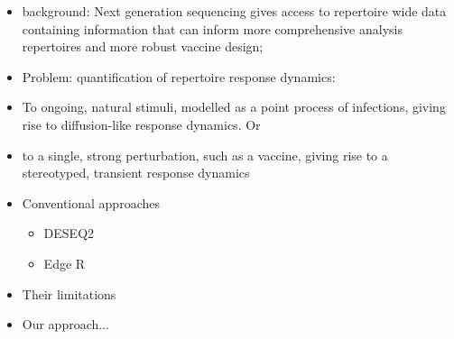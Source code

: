 \documentclass[letterpaper,english,prl,reprint,longbibliography]{revtex4-1} %
\begin{document}
\maketitle
\begin{itemize}
\item background: Next generation sequencing gives access to repertoire wide data containing information that can inform more comprehensive analysis repertoires and more robust vaccine design;
\item Problem: quantification of repertoire response dynamics:
\item To ongoing, natural stimuli, modelled as a point process of infections, giving rise to diffusion-like response dynamics. Or
\item to a single, strong perturbation, such as a vaccine, giving rise to a stereotyped, transient response dynamics
\item Conventional approaches
\begin{itemize}
	\item DESEQ2
	\item Edge R
\end{itemize}
\item  Their limitations
\item  Our approach...
\end{itemize}


\end{document}
